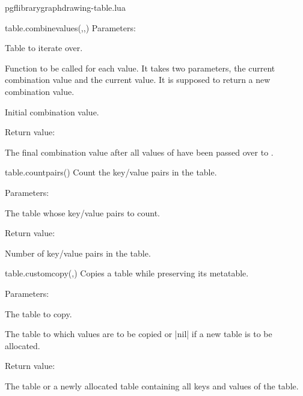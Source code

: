 \begin{filedescription}{pgflibrarygraphdrawing-table.lua}
\begin{luacommand}{{table.combine\textunderscore{}values}(,,)}
Parameters:
\begin{parameterdescription}
	\item[\meta{input}] Table to iterate over.\item[\meta{combine\_func}] Function to be called for each value. It takes two parameters, the current combination value and the current value. It is supposed to return a new combination value.\item[\meta{initial\_value}] Initial combination value. 
\end{parameterdescription}


Return value:
\begin{parameterdescription} 
  \item[] The final combination value after all values of  have been passed over to . 
\end{parameterdescription}


\end{luacommand}
\begin{luacommand}{{table.count\textunderscore{}pairs}()}
Count the key/value pairs in the table. 

Parameters:
\begin{parameterdescription}
	\item[\meta{input}] The table whose key/value pairs to count. 
\end{parameterdescription}


Return value:
\begin{parameterdescription} 
  \item[] Number of key/value pairs in the table. 
\end{parameterdescription}


\end{luacommand}
\begin{luacommand}{{table.custom\textunderscore{}copy}(,)}
Copies a table while preserving its metatable. 

Parameters:
\begin{parameterdescription}
	\item[\meta{source}] The table to copy.\item[\meta{target}] The table to which values are to be copied or |nil| if a new table is to be allocated. 
\end{parameterdescription}


Return value:
\begin{parameterdescription} 
  \item[] The  table or a newly allocated table containing all keys and values of the  table. 
\end{parameterdescription}



\end{luacommand}
\end{filedescription}
